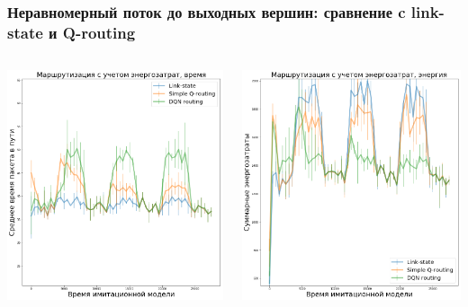 \documentclass{beamer}
\begin{document}
\begin{frame}
  \frametitle{Неравномерный поток до выходных вершин: сравнение c link-state и Q-routing}
  \begin{columns}
    \begin{column}{0.5\textwidth}
      \includegraphics[width=\textwidth]{experiment-conveyors-en1-time-tall}
    \end{column}
    \begin{column}{0.5\textwidth}
      \includegraphics[width=\textwidth]{experiment-conveyors-en1-energy-tall}
    \end{column}
  \end{columns}
\end{frame}
\end{document}
